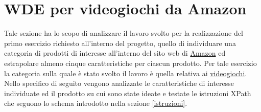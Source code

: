 \documentclass[12pt, letterpaper]{article}
\begin{document}
\section{WDE per videogiochi da Amazon} \label{sezione1}
Tale sezione ha lo scopo di analizzare il lavoro svolto per la realizzazione del primo esercizio richiesto all'interno del progetto, quello di individuare una categoria di prodotti di interesse all'interno del sito web di \href{https://www.amazon.it}{Amazon} ed estrapolare almeno cinque caratteristiche per ciascun prodotto. Per tale esercizio la categoria sulla quale è stato svolto il lavoro è quella relativa ai \href{https://www.amazon.it/s/ref=nb_sb_noss?__mk_it_IT=ÅMÅŽÕÑ&url=search-alias\%3Dvideogames&field-keywords=&crid=2GIVFOZXKUAZD&sprefix=\%2Cvideogames\%2C110}{videogiochi}.  Nello specifico di seguito vengono analizzate le caratteristiche di interesse individuate ed il prodotto su cui sono state ideate e testate le istruzioni XPath che seguono lo schema introdotto nella sezione \ref{istruzioni}.
\end{document}
